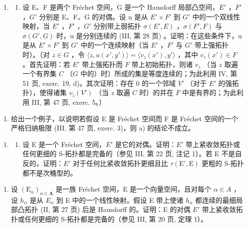 \begin{enumerate}
\def\labelenumi{\arabic{enumi})}
\setcounter{enumi}{12}
\tightlist
\item
  \begin{enumerate}
  \def\labelenumii{\alph{enumii})}
  \tightlist
  \item
    设 E、F 是两个 Fréchet 空间，G 是一个 Hausdorff 局部凸空间，\(E'\) ，\(F'\) ，\(G'\) 分别是 E、F、G 的对偶。设 u 是从 \(E' \times F'\) 到 \(G'\) 中的一个双线性映射，当 \(E'\) ，\(F'\) ，\(G'\) 分别带上弱拓扑 \(\sigma(E', E)\) ，\(\sigma(F', F)\) 与 \(\sigma(G', G)\) 时，u 是分别连续的 (III, 第 28 页) 。证明：在这些条件下，u 是从 \(E' \times F'\) 到 \(G'\) 中的一个连续映射（当 \(E'\) ，\(F'\) 与 \(G'\) 带上强拓扑时）。（对 \(z \in G\) ，令 \(\langle z, u(x', y') \rangle = \langle v_z(x'), y' \rangle\) ，其中 \(v_z(x') \in F\) 。首先证明：若 \(E'\) 带上强拓扑而 \(F\) 带上初始拓扑，则诸 \(v_z\) （当 \(z\) 取遍一个有界集 \(C\) （\(G\) 中的）时）所成的集是等度连续的；为此利用 IV, 第 51 页, exerc. 19, d)。其次证明：存在 0 的一个邻域 \(V'\) （对于 \(E'\) 的强拓扑），使得诸集 \(v_z(V')\) （当 \(z\) 取遍 \(C\) 时）的并在 \(F\) 中是有界的；为此利用 III, 第 47 页, exerc. 5。）
  \end{enumerate}
\end{enumerate}

\begin{enumerate}
\def\labelenumi{\alph{enumi})}
\setcounter{enumi}{1}
\tightlist
\item
  给出一个例子，以说明若假设 E 是 Fréchet 空间而 F 是 Fréchet 空间的一个严格归纳极限 (III, 第 47 页, exerc. 3)，则 a) 的结论不成立。
\end{enumerate}

\begin{enumerate}
\def\labelenumi{\arabic{enumi})}
\setcounter{enumi}{13}
\tightlist
\item
  \begin{enumerate}
  \def\labelenumii{\alph{enumii})}
  \tightlist
  \item
    设 E 是一个 Fréchet 空间，\(E'\) 是它的对偶。证明：\(E'\) 带上紧收敛拓扑或任何更细的 S-拓扑都是完备的（参见 III, 第 22 页, 注记 1）。若 E 不是自反的，证明：\(E'\) 对于任何比紧收敛拓扑更细且比 \(\tau(\mathrm{E}', \mathrm{E})\) 更粗的 S-拓扑都不是次桶型的。
  \end{enumerate}
\end{enumerate}

\begin{enumerate}
\def\labelenumi{\alph{enumi})}
\setcounter{enumi}{1}
\tightlist
\item
  设 \((\mathrm{E}_{\alpha})_{\alpha\in\mathbf{A}}\) 是一族 Fréchet 空间，E 是一个向量空间，且对每个 \(\alpha\in A\) ，设 \(h_{\alpha}\) 是从 \(E_{\alpha}\) 到 E 中的一个线性映射。假设 E 带上使诸 \(h_{\alpha}\) 都连续的最细局部凸拓扑 (II, 第 27 页) 后是 Hausdorff 的。证明：E 的对偶 \(E'\) 带上紧收敛拓扑或任何更细的 S-拓扑都是完备的（参见 III, 第 20 页, 定理 1）。
\end{enumerate}

